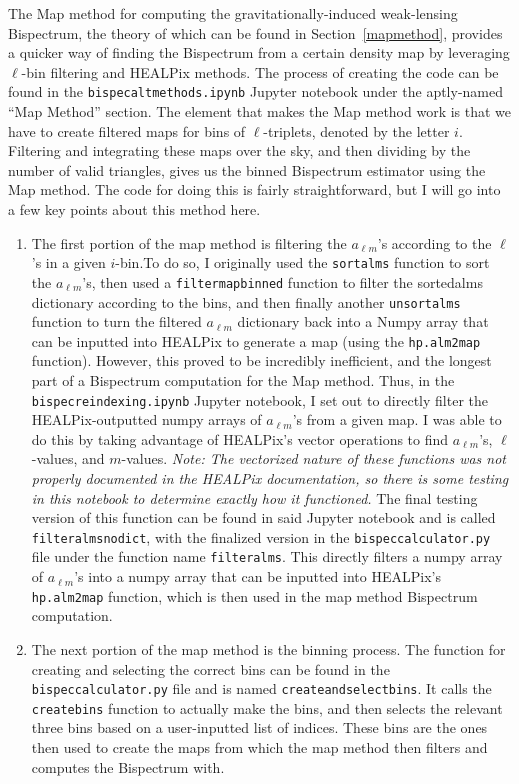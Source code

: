 \documentclass[11pt]{article}
\renewcommand{\_}[1]{\underline{ #1 }}
\newcommand{\us}{\textunderscore}
\begin{document}
{The Map method for computing the gravitationally-induced weak-lensing Bispectrum, the theory of which can be found in Section~\ref{mapmethod}, provides a quicker way of finding the Bispectrum from a certain density map by leveraging $\ell$-bin filtering and HEALPix methods. The process of creating the code can be found in the \texttt{bispec\us alt\us methods.ipynb} Jupyter notebook under the aptly-named ``Map Method'' section. The element that makes the Map method work is that we have to create filtered maps for bins of $\ell$-triplets, denoted by the letter $i$. Filtering and integrating these maps over the sky, and then dividing by the number of valid triangles, gives us the binned Bispectrum estimator using the Map method. The code for doing this is fairly straightforward, but I will go into a few key points about this method here.
\begin{enumerate}
    \item The first portion of the map method is filtering the $a_{\ell m}$'s according to the $\ell$'s in a given $i$-bin.To do so, I originally used the \texttt{sort\us alms} function to sort the $a_{\ell m}$'s, then used a \texttt{filter\us map\us binned} function to filter the sorted\us alms dictionary according to the bins, and then finally another \texttt{unsort\us alms} function to turn the filtered $a_{\ell m}$ dictionary back into a Numpy array that can be inputted into HEALPix to generate a map (using the \texttt{hp.alm2map} function). However, this proved to be incredibly inefficient, and the longest part of a Bispectrum computation for the Map method. Thus, in the \texttt{bispec\us reindexing.ipynb} Jupyter notebook, I set out to directly filter the HEALPix-outputted numpy arrays of $a_{\ell m}$'s from a given map. I was able to do this by taking advantage of HEALPix's vector operations to find $a_{\ell m}$'s, $\ell$-values, and $m$-values. \textit{Note: The vectorized nature of these functions was not properly documented in the HEALPix documentation, so there is some testing in this notebook to determine exactly how it functioned.} The final testing version of this function can be found in said Jupyter notebook and is called \texttt{filter\us alms\us no\us dict}, with the finalized version in the \texttt{bispec\us calculator.py} file under the function name \texttt{filter\us alms}. This directly filters a numpy array of $a_{\ell m}$'s into a numpy array that can be inputted into HEALPix's \texttt{hp.alm2map} function, which is then used in the map method Bispectrum computation.
    \item The next portion of the map method is the binning process. The function for creating and selecting the correct bins can be found in the \texttt{bispec\us calculator.py} file and is named \texttt{create\us and\us select\us bins}. It calls the \texttt{\us create\us bins} function to actually make the bins, and then selects the relevant three bins based on a user-inputted list of indices. These bins are the ones then used to create the maps from which the map method then filters and computes the Bispectrum with.

\end{enumerate}}
\end{document}
